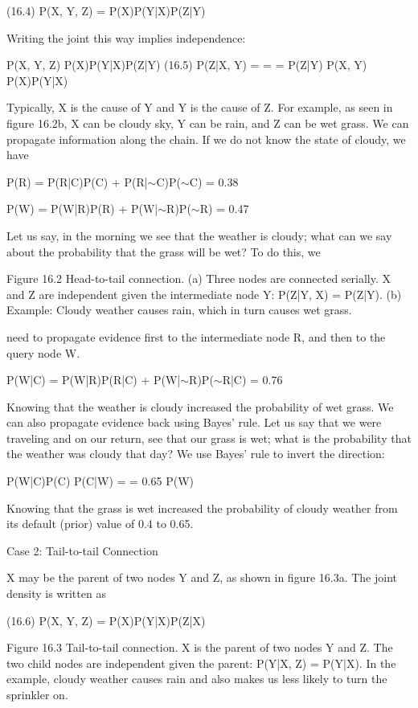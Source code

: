(16.4) P(X, Y, Z) = P(X)P(Y|X)P(Z|Y)

Writing the joint this way implies independence:

P(X, Y, Z) P(X)P(Y|X)P(Z|Y) (16.5) P(Z|X, Y) = = = P(Z|Y) P(X, Y) P(X)P(Y|X)

Typically, X is the cause of Y and Y is the cause of Z. For example, as seen in figure 16.2b, X can be cloudy sky, Y can be rain, and Z can be wet grass. We can propagate information along the chain. If we do not know the state of cloudy, we have

P(R) = P(R|C)P(C) + P(R|$\sim$C)P($\sim$C) = 0.38

P(W) = P(W|R)P(R) + P(W|$\sim$R)P($\sim$R) = 0.47

Let us say, in the morning we see that the weather is cloudy; what can we say about the probability that the grass will be wet? To do this, we

Figure 16.2 Head-to-tail connection. (a) Three nodes are connected serially. X and Z are independent given the intermediate node Y: P(Z|Y, X) = P(Z|Y). (b) Example: Cloudy weather causes rain, which in turn causes wet grass.

need to propagate evidence first to the intermediate node R, and then to the query node W.

P(W|C) = P(W|R)P(R|C) + P(W|$\sim$R)P($\sim$R|C) = 0.76

Knowing that the weather is cloudy increased the probability of wet grass. We can also propagate evidence back using Bayes’ rule. Let us say that we were traveling and on our return, see that our grass is wet; what is the probability that the weather was cloudy that day? We use Bayes’ rule to invert the direction:

P(W|C)P(C) P(C|W) = = 0.65 P(W)

Knowing that the grass is wet increased the probability of cloudy weather from its default (prior) value of 0.4 to 0.65.

Case 2: Tail-to-tail Connection

X may be the parent of two nodes Y and Z, as shown in figure 16.3a. The joint density is written as

(16.6) P(X, Y, Z) = P(X)P(Y|X)P(Z|X)

Figure 16.3 Tail-to-tail connection. X is the parent of two nodes Y and Z. The two child nodes are independent given the parent: P(Y|X, Z) = P(Y|X). In the example, cloudy weather causes rain and also makes us less likely to turn the sprinkler on.

